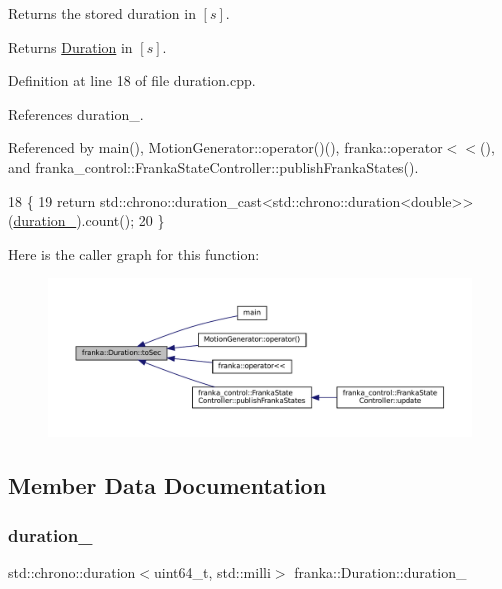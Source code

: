 Returns the stored duration in $[s]$.

\begin{DoxyReturn}{Returns}
\hyperlink{classfranka_1_1Duration}{Duration} in $[s]$. 
\end{DoxyReturn}


Definition at line 18 of file duration.\+cpp.



References duration\+\_\+.



Referenced by main(), Motion\+Generator\+::operator()(), franka\+::operator$<$$<$(), and franka\+\_\+control\+::\+Franka\+State\+Controller\+::publish\+Franka\+States().


\begin{DoxyCode}
18                                       \{
19   \textcolor{keywordflow}{return} std::chrono::duration\_cast<std::chrono::duration<double>>(\hyperlink{classfranka_1_1Duration_ae446c403b200f0dbf92fb51ca21e82ff}{duration\_}).count();
20 \}
\end{DoxyCode}
Here is the caller graph for this function\+:
\nopagebreak
\begin{figure}[H]
\begin{center}
\leavevmode
\includegraphics[width=350pt]{classfranka_1_1Duration_a497af77a3280159547f231f0374e9ac1_icgraph}
\end{center}
\end{figure}


\subsection{Member Data Documentation}
\mbox{\label{classfranka_1_1Duration_ae446c403b200f0dbf92fb51ca21e82ff}} 
\subsubsection{\texorpdfstring{duration\+\_\+}{duration\_}}
{\footnotesize\ttfamily std\+::chrono\+::duration$<$uint64\+\_\+t, std\+::milli$>$ franka\+::\+Duration\+::duration\+\_\+\hspace{0.3cm}{\ttfamily [private]}}



